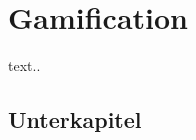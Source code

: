 \section{Gamification}
\label{sec:theorieB}

text.. \cite{WhatHumanComputerInteraction2019}

\subsection{Unterkapitel}
\label{sec:theorieBa}
